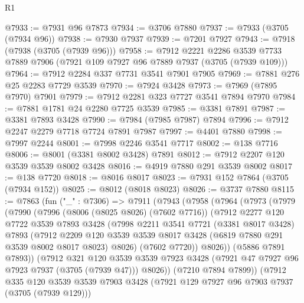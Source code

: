 \begin{lexlean}{R1}
\begin{coremodule}
@7933 := @7931 @96 @7873
@7934 := @3706 @7880
@7937 := @7933 (@3705 (@7934 @96))
@7938 := @7930 @7937
@7939 := @7201 @7927
@7943 := @7918 (@7938 (@3705 (@7939 @96)))
@7958 := @7912
    @2221
    @2286
    @3539
    @7733
    @7889
    @7906
    (@7921 @109 @7927 @96 @7889 @7937 (@3705 (@7939 @109)))
@7964 := @7912 @2284 @337 @7731 @3541 @7901 @7905
@7969 := @7881 @276 @25 @2283 @7729 @3539
@7970 := @7924 @3428
@7973 := @7969 (@7895 @7970) @7901
@7979 := @7912 @2281 @323 @7727 @3541 @7894 @7970
@7984 := @7881 @1781 @24 @2280 @7725 @3539
@7985 := @3381 @7891
@7987 := @3381 @7893 @3428
@7990 := @7984 (@7985 @7987) @7894
@7996 := @7912 @2247 @2279 @7718 @7724 @7891 @7987
@7997 := @4401 @7880
@7998 := @7997 @2244
@8001 := @7998 @2246 @3541 @7717
@8002 := @138 @7716
@8006 := @8001 (@3381 @8002 @3428) @7891
@8012 := @7912 @2207 @120 @3539 @3539 @8002 @3428
@8016 := @4919 @7880 @291 @3539 @8002
@8017 := @138 @7720
@8018 := @8016 @8017
@8023 := @7931 @152 @7864 (@3705 (@7934 @152))
@8025 := @8012 (@8018 @8023)
@8026 := @3737 @7880
@8115 := @7863
    (fun ("_" : @7306) =>
    @7911
      (@7943
        (@7958
          (@7964
            (@7973
              (@7979
                (@7990
                  (@7996
                    (@8006 (@8025 @8026) (@7602 @7716))
                    (@7912
                      @2277
                      @120
                      @7722
                      @3539
                      @7893
                      @3428
                      (@7998
                        @2211
                        @3541
                        @7721
                        (@3381 @8017 @3428)
                        @7893
                        (@7912
                          @2209
                          @120
                          @3539
                          @3539
                          @8017
                          @3428
                          (@6819 @7880 @291 @3539 @8002 @8017 @8023)
                          @8026)
                        (@7602 @7720))
                      @8026))
                  (@5886 @7891 @7893))
                (@7912
                  @321
                  @120
                  @3539
                  @3539
                  @7923
                  @3428
                  (@7921 @47 @7927 @96 @7923 @7937 (@3705 (@7939 @47)))
                  @8026))
              (@7210 @7894 @7899))
            (@7912
              @335
              @120
              @3539
              @3539
              @7903
              @3428
              (@7921 @129 @7927 @96 @7903 @7937 (@3705 (@7939 @129)))

\end{coremodule}
\end{lexlean}
